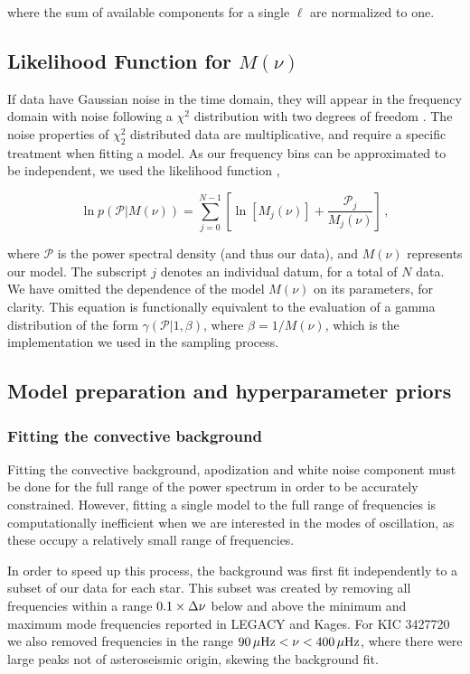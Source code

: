 \noindent where the sum of available components for a single $\ell$ are normalized to one.

\subsection{Likelihood Function for $M(\nu)$}\label{sec:like}
If data have Gaussian noise in the time domain, they will appear in the frequency domain with noise following a $\chi^2$ distribution with two degrees of freedom \cite[$\chi^2_2$ hereafter]{appourchaux+1998}. The noise properties of $\chi^2_2$ distributed data are multiplicative, and require a specific treatment when fitting a model. As our frequency bins can be approximated to be independent, we used the likelihood function \cite{anderson+1990},

\begin{equation}
	\ln p(\mathcal{P} | M(\nu)) = \sum_{j=0}^{N-1} \left[\ln[M_j(\nu)] + \frac{\mathcal{P}_j}{M_j(\nu)}\right]\, , 
\end{equation}

\noindent where $\mathcal{P}$ is the power spectral density (and thus our data), and $M(\nu)$ represents our model. The subscript $j$ denotes an individual datum, for a total of $N$ data. We have omitted the dependence of the model $M(\nu)$ on its parameters, for clarity. This equation is functionally equivalent to the evaluation of a gamma distribution of the form $\gamma(\mathcal{P} | 1, \beta)$, where $\beta = 1/M(\nu)$, which is the implementation we used in the sampling process.

\subsection{Model preparation and hyperparameter priors}
\subsubsection{Fitting the convective background}\label{sec:background}
Fitting the convective background, apodization and white noise component must be done for the full range of the power spectrum in order to be accurately constrained. However, fitting a single model to the full range of frequencies is computationally inefficient when we are interested in the modes of oscillation, as these occupy a relatively small range of frequencies.

In order to speed up this process, the background was first fit independently to a subset of our data for each star. This subset was created by removing all frequencies within a range $0.1 \times \mbox{$\Delta \nu$}$ below and above the minimum and maximum mode frequencies reported in LEGACY and Kages. For KIC 3427720 we also removed frequencies in the range $90\, \mu\rm{Hz} < \nu < 400\, \mu{\rm{Hz}}$, where there were large peaks not of asteroseismic origin, skewing the background fit.

